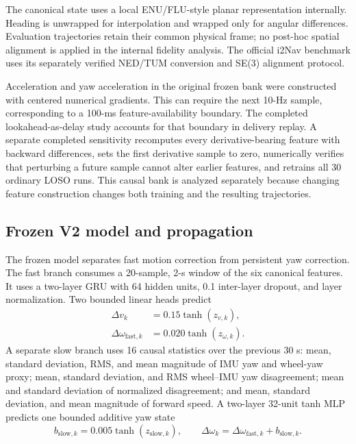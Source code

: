 \documentclass[journal,onecolumn]{IEEEtran}
\begin{document}
The canonical state uses a local ENU/FLU-style planar representation internally. Heading is unwrapped for interpolation and wrapped only for angular differences. Evaluation trajectories retain their common physical frame; no post-hoc spatial alignment is applied in the internal fidelity analysis. The official i2Nav benchmark uses its separately verified NED/TUM conversion and SE(3) alignment protocol.

Acceleration and yaw acceleration in the original frozen bank were constructed with centered numerical gradients. This can require the next 10-Hz sample, corresponding to a 100-ms feature-availability boundary. The completed lookahead-as-delay study accounts for that boundary in delivery replay. A separate completed sensitivity recomputes every derivative-bearing feature with backward differences, sets the first derivative sample to zero, numerically verifies that perturbing a future sample cannot alter earlier features, and retrains all 30 ordinary LOSO runs. This causal bank is analyzed separately because changing feature construction changes both training and the resulting trajectories.

\subsection{Frozen V2 model and propagation}
The frozen model separates fast motion correction from persistent yaw correction. The fast branch consumes a 20-sample, 2-s window of the six canonical features. It uses a two-layer GRU with 64 hidden units, 0.1 inter-layer dropout, and layer normalization. Two bounded linear heads predict
\begin{align}
\Delta v_k&=0.15\tanh(z_{v,k}),\\
\Delta\omega_{\mathrm{fast},k}&=0.020\tanh(z_{\omega,k}).
\end{align}
A separate slow branch uses 16 causal statistics over the previous 30 s: mean, standard deviation, RMS, and mean magnitude of IMU yaw and wheel-yaw proxy; mean, standard deviation, and RMS wheel--IMU yaw disagreement; mean and standard deviation of normalized disagreement; and mean, standard deviation, and mean magnitude of forward speed. A two-layer 32-unit tanh MLP predicts one bounded additive yaw state
\begin{equation}
b_{\mathrm{slow},k}=0.005\tanh(z_{\mathrm{slow},k}),\qquad
\Delta\omega_k=\Delta\omega_{\mathrm{fast},k}+b_{\mathrm{slow},k}.
\end{equation}
\end{document}

